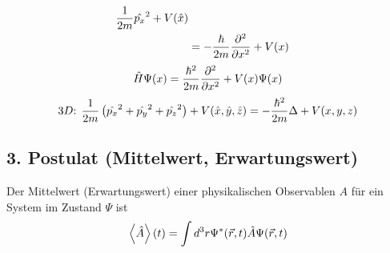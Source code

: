 \begin{bem}
\begin{bei}
\begin{align*}
                                \frac{1}{2m}\hat{p_x}^2 + V(\hat{x}) \\
                    &= -\frac{\hbar}{2m}\frac{\partial^2}{\partial x^2}+V(x)
            \end{align*}
            \begin{equation*}
                \hat{H}\Psi(x) = \frac{\hbar^2}{2m}\frac{\partial^2}{\partial x^2}+V(x)\Psi(x)
            \end{equation*}
            \begin{equation*}
                \text{$3D$: } \frac{1}{2m}\left( \hat{p_x}^2 + \hat{p_y}^2 + \hat{p_z}^2
                \right) + V (\hat{x},\hat{y},\hat{z}) = - \frac{\hbar^2}{2m} \Delta + V (x,y,z)
            \end{equation*}
    \end{bei}
\end{bem}
\subsection{3. Postulat (Mittelwert, Erwartungswert)} %
\label{ssub:3. Postulat_(Mittelwert,_Erwartungswert)}
Der Mittelwert (Erwartungswert) einer physikalischen Observablen $A$ für ein
System im Zustand $\Psi$ ist
\begin{equation*}
    \left\langle \hat{A} \right\rangle(t) = \int d^3r \Psi^* (\vec{r},t) \hat{A} \Psi(\vec{r},t)
\end{equation*}

